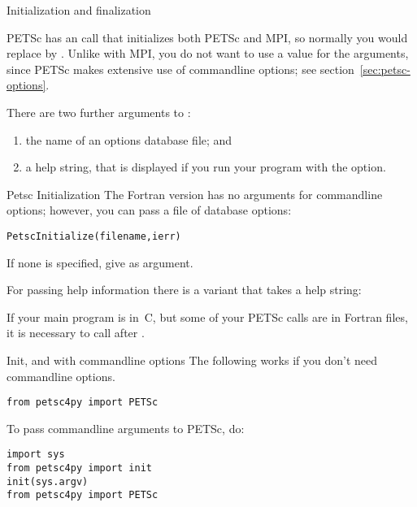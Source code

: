  {Initialization and finalization}
\label{sec:petscinit}

PETSc has an call that initializes both PETSc and MPI, so normally you
would replace  by
.
Unlike with MPI, you do not want to
use a  value for the  arguments, since PETSc
makes extensive use of commandline options; see
section~\ref{sec:petsc-options}.


There are two further arguments to :
\begin{enumerate}
\item the name of an options database file; and
\item a help string, that is displayed if you run your program with the  option.
\end{enumerate}

\begin{fortrannote}{Petsc Initialization}
  The Fortran version has no arguments for commandline options;
  however, you can pass a file of database options:
\begin{lstlisting}
PetscInitialize(filename,ierr)    
\end{lstlisting}
  If none is specified, give  as argument.

  For passing help information there is a variant that takes a help string:

  If your main program is in~C, but some of your PETSc calls are
    in Fortran files, it is necessary to call
     after
    .
\end{fortrannote}

\begin{pythonnote}{Init, and with commandline options}
  The following works if you don't need commandline options.
\begin{verbatim}
from petsc4py import PETSc
\end{verbatim}
To pass commandline arguments to PETSc, do:
\begin{verbatim}
import sys
from petsc4py import init
init(sys.argv)
from petsc4py import PETSc
\end{verbatim}
\end{pythonnote}

